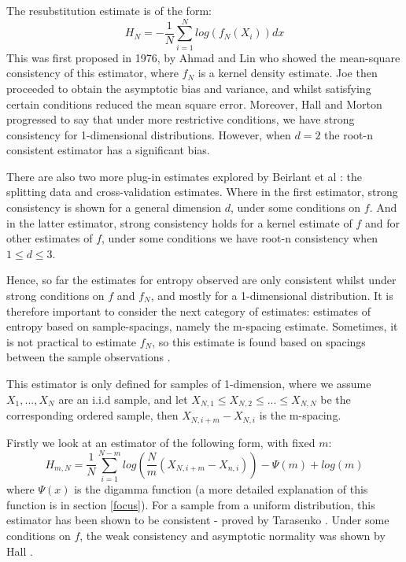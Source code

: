 \documentclass[12pt]{report}
\begin{document}
The resubstitution estimate is of the form:
\begin{equation}
H_{N} = - \frac{1}{N}\sum_{i=1}^{N}  log ( f_{N}(X_{i}) )dx
\end{equation}
This was first proposed in 1976, by Ahmad and Lin \cite{resest1} who showed the mean-square consistency of this estimator, where  $f_{N}$ is a kernel density estimate. Joe \cite{intest2} then proceeded to obtain the asymptotic bias and variance, and whilst satisfying certain conditions reduced the mean square error. Moreover, Hall and Morton \cite{resest2} progressed to say that under more restrictive conditions, we have strong consistency for 1-dimensional distributions. However, when $d=2$ the root-n consistent estimator has a significant bias.

There are also two more plug-in estimates explored by Beirlant et al \cite{paper10}: the splitting data and cross-validation estimates. Where in the first estimator, strong consistency is shown for a general dimension $d$, under some conditions on $f$. And in the latter estimator, strong consistency holds for a kernel estimate of $f$ and for other estimates of $f$, under some conditions we have root-n consistency when $1 \leq d \leq 3$.

Hence, so far the estimates for entropy observed are only consistent whilst under strong conditions on $f$ and $f_{N}$, and mostly for a 1-dimensional distribution. It is therefore important to consider the next category of estimates: estimates of entropy based on sample-spacings, namely the m-spacing estimate. Sometimes, it is not practical to estimate $f_{N}$, so this estimate is found based on spacings between the sample observations \cite{spacest1, spacest2}.

This estimator is only defined for samples of 1-dimension, where we assume $X_{1}, ..., X_{N}$ are an i.i.d sample, and let $X_{N, 1} \leq X_{N, 2} \leq ... \leq X_{N, N}$ be the corresponding ordered sample, then $X_{N, i+m} - X_{N, i}$ is the m-spacing.

Firstly we look at an estimator of the following form, with fixed $m$:
\begin{equation}
H_{m, N} = \frac{1}{N} \sum_{i=1}^{N-m} log \left(\frac{N}{m} (X_{N, i+m} - X_{n, i}) \right) - \Psi(m) + log(m)
\end{equation}
where $\Psi(x)$ is the digamma function (a more detailed explanation of this function is in section \ref{focus}). For a sample from a uniform distribution, this estimator has been shown to be consistent - proved by Tarasenko \cite{spacest1}. Under some conditions on $f$, the weak consistency and asymptotic normality was shown by Hall \cite{spacest2}.
\end{document}
